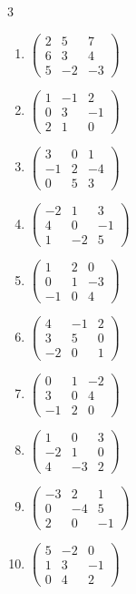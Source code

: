 \begin{multicols}{3}\raggedright
\begin{enumerate}[label=\arabic*.,  leftmargin=*]
\item $\begin{pmatrix}2&5&7\\6&3&4\\5&-2&-3\end{pmatrix}$
\item $\begin{pmatrix}1&-1&2\\0&3&-1\\2&1&0\end{pmatrix}$
\item $\begin{pmatrix}3&0&1\\-1&2&-4\\0&5&3\end{pmatrix}$
\item $\begin{pmatrix}-2&1&3\\4&0&-1\\1&-2&5\end{pmatrix}$
\item $\begin{pmatrix}1&2&0\\0&1&-3\\-1&0&4\end{pmatrix}$
\item $\begin{pmatrix}4&-1&2\\3&5&0\\-2&0&1\end{pmatrix}$
\item $\begin{pmatrix}0&1&-2\\3&0&4\\-1&2&0\end{pmatrix}$
\item $\begin{pmatrix}1&0&3\\-2&1&0\\4&-3&2\end{pmatrix}$
\item $\begin{pmatrix}-3&2&1\\0&-4&5\\2&0&-1\end{pmatrix}$
\item $\begin{pmatrix}5&-2&0\\1&3&-1\\0&4&2\end{pmatrix}$

\end{enumerate}
\end{multicols}

